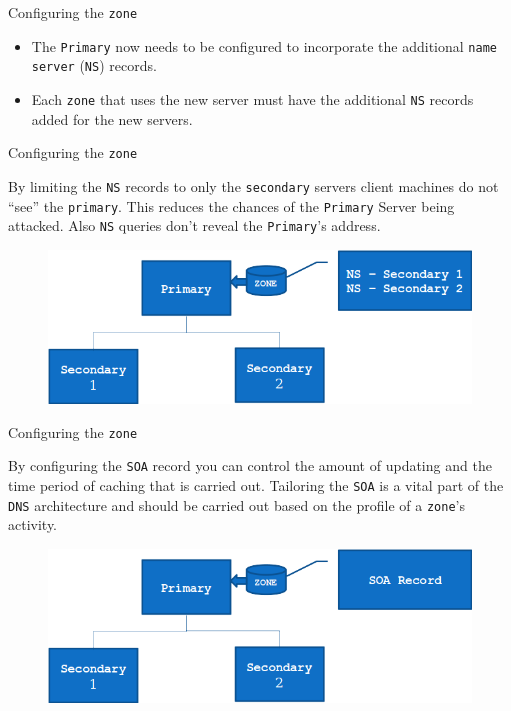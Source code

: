 \documentclass[xcolor=table,aspectratio=169]{beamer}
\begin{document}
\begin{frame}{Configuring the \texttt{zone}}
  \begin{itemize}
    \item The \texttt{Primary} now needs to be configured to incorporate the additional \texttt{name server} (\texttt{NS}) records.
    \item Each \texttt{zone} that uses the new server must have the additional \texttt{NS} records added for the new servers.
  \end{itemize}
\end{frame}

\begin{frame}{Configuring the \texttt{zone}}
  \begin{tcolorbox}[title={\textbf{SECURITY:}}]
      By limiting the \texttt{NS} records to only the \texttt{secondary} servers client machines do not ``see'' the \texttt{primary}. This reduces the chances of the \texttt{Primary} Server being attacked. Also \texttt{NS} queries don't reveal the \texttt{Primary}'s address.
  \end{tcolorbox}
  \begin{figure}
    \begin{center}
      \includegraphics[width=.65\linewidth]{Secondary.png}
    \end{center}
  \end{figure}
\end{frame}

\begin{frame}{Configuring the \texttt{zone}}
  \begin{tcolorbox}[title={\textbf{PERFORMANCE:}}]
    By configuring the \texttt{SOA} record you can control the amount of updating and the time period of caching that is carried out. Tailoring the \texttt{SOA} is a vital part of the \texttt{DNS} architecture and should be carried out based on the profile of a \texttt{zone}'s activity.
  \end{tcolorbox}
  \begin{figure}
    \begin{center}
      \includegraphics[width=.65\linewidth]{Secondary2.png}
    \end{center}
  \end{figure}
\end{frame}
\end{document}
